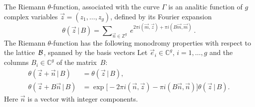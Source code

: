 \documentclass[a4paper,11pt]{article}
\newcommand{\comp}{\mathbb C}
\newcommand{\inte}{\mathbb Z}
\newcommand{\cB}{{\cal B}}
\theoremstyle{plain}
\theoremstyle{remark}
\begin{document}
The Riemann $\theta$-function, associated with the curve $\Gamma$ is an
analitic function of $g$ complex variables $\Vec{z}=(z_1,\dots,z_g)$,
defined by its Fourier expansion
$$
\theta(\Vec{z}\,|\,B)=\sum\nolimits_{\Vec{n}\in\inte^g}
\ e^{2\pi i (\Vec{m},\Vec{z}) + \pi i (B\Vec{m},\Vec{m})}\ .
$$
The Riemann $\theta$-function has the following monodromy properties
with respect to the lattice~$\cB$, spanned by the basis vectors
Let $\Vec{e}_i\in\comp^g$, $i=1,\dots,g$ and the columns $B_i\in\comp^g$
of the matrix~$B$:
\begin{equation}\label{thm}
\begin{aligned}
\theta(\Vec{z}+\Vec{n}\,|\,B) &=\theta(\Vec{z}\,|\,B),\\
\theta(\Vec{z}+B\Vec{n}\,|\,B) &=
\exp\bigl[ -2\pi i(\Vec{n},\Vec{z})-\pi i (B\Vec{n},\Vec{n}) \bigr]
\theta(\Vec{z}\,|\,B) .
\end{aligned}
\end{equation}
Here $\Vec{n}$ is a vector with integer components.
\end{document}
